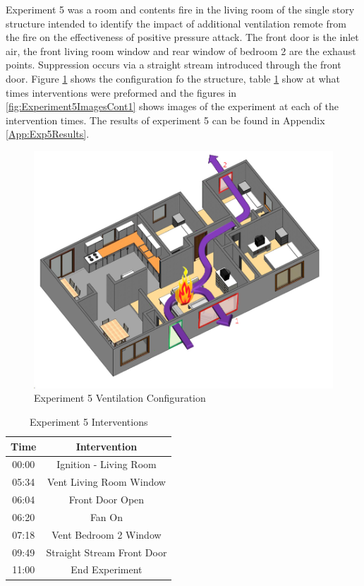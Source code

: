 \documentclass{article}
\begin{document}
Experiment 5 was a room and contents fire in the living room of the single story structure intended to identify the impact of additional ventilation remote from the fire on the effectiveness of positive pressure attack. The front door is the inlet air, the front living room window and rear window of bedroom 2 are the exhaust points. Suppression occurs via a straight stream introduced through the front door. Figure \ref{fig:Exp5VentConfig} shows the configuration fo the structure, table \ref{Table:Exp5Interventions} show at what times interventions were preformed and the figures in \ref{fig:Experiment5ImagesCont1} shows images of the experiment at each of the intervention times. The results of experiment 5 can be found in Appendix \ref{App:Exp5Results}.

\begin{figure}[h!]
	\centering
	\includegraphics[width=5in]{0_Images/FireExperiments/Single_Story/Experiment_5.jpg}
	\caption{Experiment 5 Ventilation Configuration}
	\label{fig:Exp5VentConfig}
\end{figure}

\begin{table}[H]
	\centering
	\caption{Experiment 5 Interventions}
	\begin{tabular}{|c|c|} 
		\hline
		Time & Intervention \\ \hline \hline
		00:00 & Ignition - Living Room \\ \hline
		05:34 & Vent Living Room Window \\ \hline
		06:04 & Front Door Open \\ \hline
		06:20 & Fan On \\ \hline
		07:18 & Vent Bedroom 2 Window \\ \hline
		09:49 & Straight Stream Front Door \\ \hline
		11:00 & End Experiment \\ \hline
	\end{tabular}
	\label{Table:Exp5Interventions}
\end{table}
\end{document}
